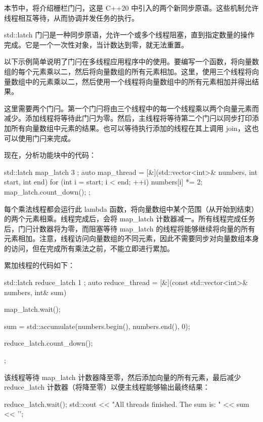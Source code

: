 本节中，将介绍栅栏门闩，这是 C++20 中引入的两个新同步原语。这些机制允许线程相互等待，从而协调并发任务的执行。


std::latch 门闩是一种同步原语，允许一个或多个线程阻塞，直到指定数量的操作完成。它是一个一次性对象，当计数达到零，就无法重置。

以下示例简单说明了门闩在多线程应用程序中的使用。要编写一个函数，将向量数组的每个元素乘以二，然后将向量数组的所有元素相加。这里，使用三个线程将向量数组中的元素乘以二，然后使用一个线程将向量数组中的所有元素相加并得出结果。

这里需要两个门闩。第一个门闩将由三个线程中的每一个线程乘以两个向量元素而减少。添加线程将等待此门闩为零。然后，主线程将等待第二个门闩以同步打印添加所有向量数组中元素的结果。也可以等待执行添加的线程在其上调用 join，这也可以使用门闩来完成。

现在，分析功能块中的代码：

\begin{cpp}
std::latch map_latch{ 3 };
auto map_thread = [&](std::vector<int>& numbers, int start, int end) {
    for (int i = start; i < end; ++i) {
        numbers[i] *= 2;
    }
    map_latch.count_down();
};
\end{cpp}

每个乘法线程都会运行此 lambda 函数，将向量数组中某个范围（从开始到结束）的两个元素相乘。线程完成后，会将 map\_latch 计数器减一。所有线程完成任务后，门闩计数器将为零，而阻塞等待 map\_latch 的线程将能够继续将向量的所有元素相加。注意，线程访问向量数组的不同元素，因此不需要同步对向量数组本身的访问，但在完成所有乘法之前，不能立即进行累加。

累加线程的代码如下：

\begin{cpp}
std::latch reduce_latch{ 1 };
auto reduce_thread = [&](const std::vector<int>& numbers, int& sum) {
    map_latch.wait();

    sum = std::accumulate(numbers.begin(), numbers.end(), 0);

    reduce_latch.count_down();
};
\end{cpp}

该线程等待 map\_latch 计数器降至零，然后添加向量的所有元素，最后减少 reduce\_latch 计数器（将降至零）以便主线程能够输出最终结果：

\begin{cpp}
reduce_latch.wait();
std::cout << "All threads finished. The sum is: " << sum << '\n';
\end{cpp}

